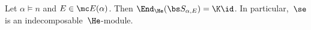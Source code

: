 \begin{thm}	\label{thm:end:end_is_c}
	Let $\alpha \vDash n$ and $E\in \mc E(\alpha)$. Then $\End_{\He}(\bs S_{\alpha,E})=\K \id$. In particular,~$\se$ is an indecomposable~$\He$-module.
\end{thm}
